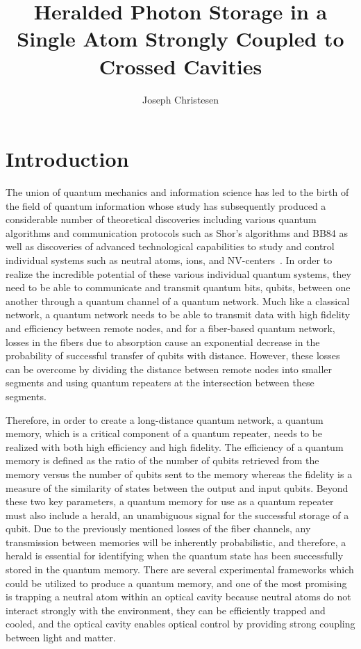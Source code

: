 \documentclass[a4paper]{article}
\title{Heralded Photon Storage in a Single Atom Strongly Coupled to Crossed Cavities}
\author{Joseph Christesen}
\date{\vspace{-5ex}}
\begin{document}
\maketitle

\onehalfspacing

\section{Introduction}

\indent\indent The union of quantum mechanics and information science has led to the birth of the field of quantum information whose study has subsequently produced a considerable number of theoretical discoveries including various quantum algorithms and communication protocols such as Shor's algorithms and BB84 as well as discoveries of advanced technological capabilities to study and control individual systems such as neutral atoms, ions, and NV-centers~\cite{Kimble2008}. In order to realize the incredible potential of these various individual quantum systems, they need to be able to communicate and transmit quantum bits, qubits, between one another through a quantum channel of a quantum network. Much like a classical network, a quantum network needs to be able to transmit data with high fidelity and efficiency between remote nodes, and for a fiber-based quantum network, losses in the fibers due to absorption cause an exponential decrease in the probability of successful transfer of qubits with distance. However, these losses can be overcome by dividing the distance between remote nodes into smaller segments and using quantum repeaters at the intersection between these segments.

Therefore, in order to create a long-distance quantum network, a quantum memory, which is a critical component of a quantum repeater, needs to be realized with both high efficiency and high fidelity. The efficiency of a quantum memory is defined as the ratio of the number of qubits retrieved from the memory versus the number of qubits sent to the memory whereas the fidelity is a measure of the similarity of states between the output and input qubits. Beyond these two key parameters, a quantum memory for use as a quantum repeater must also include a herald, an unambiguous signal for the successful storage of a qubit. Due to the previously mentioned losses of the fiber channels, any transmission between memories will be inherently probabilistic, and therefore, a herald is essential for identifying when the quantum state has been successfully stored in the quantum memory. There are several experimental frameworks which could be utilized to produce a quantum memory, and one of the most promising is trapping a neutral atom within an optical cavity because neutral atoms do not interact strongly with the environment, they can be efficiently trapped and cooled, and the optical cavity enables optical control by providing strong coupling between light and matter.  
\end{document}
